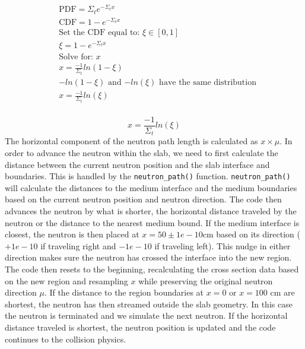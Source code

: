 \documentclass[letterpaper]{article}
\begin{document}
\begin{equation}
    \begin{split}
        & \text{PDF}=\Sigma_te^{-\Sigma_t x} \\
        & \text{CDF} = 1-e^{-\Sigma_t x} \\
        & \text{Set the CDF equal to: } \xi \in[0, 1] \\
        & \xi = 1-e^{-\Sigma_t x} \\
        & \text{Solve for: } x \\
        & x = \frac{-1}{\Sigma_t}ln(1-\xi) \\
        & \text{$-ln(1-\xi)$ and $-ln(\xi)$ have the same distribution} \\
        & x = \frac{-1}{\Sigma_t}ln(\xi) \\
    \end{split}
\end{equation}

\begin{equation}
    x=\frac{-1}{\Sigma_t}ln(\xi)
    \label{eqn:mfp}
\end{equation}
The horizontal component of the neutron path length is calculated as $x\times\mu$. In order to advance the neutron within the slab, we need to first calculate the distance between the current neutron position and the slab interface and boundaries. This is handled by the \texttt{neutron\_path()} function. \texttt{neutron\_path()} will calculate the distances to the medium interface and the medium boundaries based on the current neutron position and neutron direction. The code then advances the neutron by what is shorter, the horizontal distance traveled by the neutron or the distance to the nearest medium bound. If the medium interface is closest, the neutron is then placed at $x=50 \pm 1e-10$cm based on its direction ($+1e-10$ if traveling right and $-1e-10$ if traveling left). This nudge in either direction makes sure the neutron has crossed the interface into the new region. The code then resets to the beginning, recalculating the cross section data based on the new region and resampling $x$ while preserving the original neutron direction $\mu$. If the distance to the region boundaries at $x=0$ or $x=100$ cm are shortest, the neutron has then streamed outside the slab geometry. In this case the neutron is terminated and we simulate the next neutron. If the horizontal distance traveled is shortest, the neutron position is updated and the code continues to the collision physics.
\end{document}
